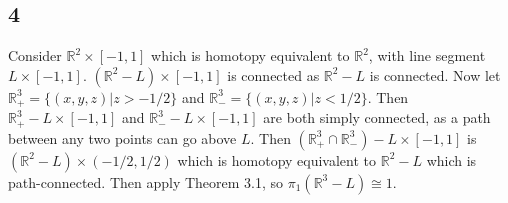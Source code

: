\documentclass{article}
\theoremstyle{definition}
\numberwithin{theorem}{section}
\numberwithin{equation}{section}
\begin{document}
\subsection{4}
Consider $\mathbb{R}^2 \times [-1,1]$ which is homotopy equivalent to $\mathbb{R}^2$, with line segment $L \times [-1,1]$. $\left(\mathbb{R}^2 - L \right)\times [-1,1]$ is connected as $\mathbb{R}^2 - L$ is connected. Now let $\mathbb{R}^3_+ = \{(x, y, z) | z > -1/2\}$ and $\mathbb{R}^3_- = \{(x, y, z) | z < 1/2\}$. Then $\mathbb{R}^3_+ - L \times [-1,1]$ and $\mathbb{R}^3_- - L \times [-1,1]$ are both simply connected, as a path between any two points can go above $L$. Then $\left(\mathbb{R}^3_+ \cap \mathbb{R}^3_-\right) - L \times [-1,1]$ is $(\mathbb{R}^2 - L) \times (-1/2, 1/2)$ which is homotopy equivalent to  $\mathbb{R}^2 - L$ which is path-connected. Then apply Theorem 3.1, so $\pi_1(\mathbb{R}^3 - L) \cong 1$. 
\end{document}
